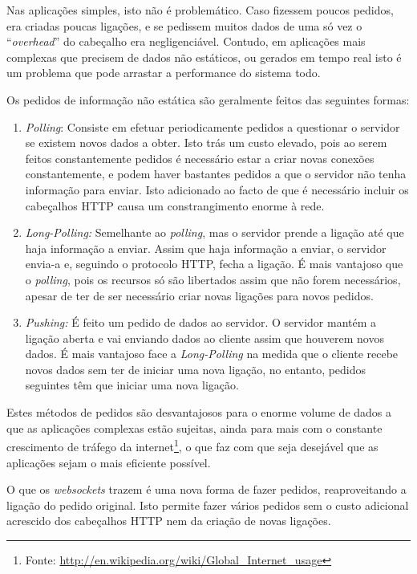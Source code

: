 \documentclass[a4paper]{article}
\begin{document}
Nas aplicações simples, isto não é problemático. Caso fizessem poucos pedidos, era criadas poucas ligações, e se pedissem muitos dados de uma só vez o "`\emph{overhead}"' do cabeçalho era negligenciável. Contudo, em aplicações mais complexas que precisem de dados não estáticos, ou gerados em tempo real isto é um problema que pode arrastar a performance do sistema todo.

Os pedidos de informação não estática são geralmente feitos das seguintes formas:
\begin{enumerate}
	\item{\emph{Polling}:} Consiste em efetuar periodicamente pedidos a questionar o servidor se existem novos dados a obter. Isto trás um custo elevado, pois ao serem feitos constantemente pedidos é necessário estar a criar novas conexões constantemente, e podem haver bastantes pedidos a que o servidor não tenha informação para enviar. Isto adicionado ao facto de que é necessário incluir os cabeçalhos HTTP causa um constrangimento enorme à rede.
	\item{\emph{Long-Polling:}} Semelhante ao \emph{polling}, mas o servidor prende a ligação até que haja informação a enviar. Assim que haja informação a enviar, o servidor envia-a e, seguindo o protocolo HTTP, fecha a ligação. É mais vantajoso que o \emph{polling}, pois os recursos só são libertados assim que não forem necessários, apesar de ter de ser necessário criar novas ligações para novos pedidos.
	\item{\emph{Pushing:}}  É feito um pedido de dados ao servidor. O servidor mantém a ligação aberta e vai enviando dados ao cliente assim que houverem novos dados. É mais vantajoso face a \emph{Long-Polling} na medida que o cliente recebe novos dados sem ter de iniciar uma nova ligação, no entanto, pedidos seguintes têm que iniciar uma nova ligação.
\end{enumerate}

Estes métodos de pedidos são desvantajosos para o enorme volume de dados a que as aplicações complexas estão sujeitas, ainda para mais com o constante crescimento de tráfego da internet\footnote{Fonte: \url{http://en.wikipedia.org/wiki/Global_Internet_usage}}, o que faz com que seja desejável que as aplicações sejam o mais eficiente possível.

O que os \emph{websockets} trazem é uma nova forma de fazer pedidos, reaproveitando a ligação do pedido original. Isto permite fazer vários pedidos sem o custo adicional acrescido dos cabeçalhos HTTP nem da criação de novas ligações.
\end{document}
